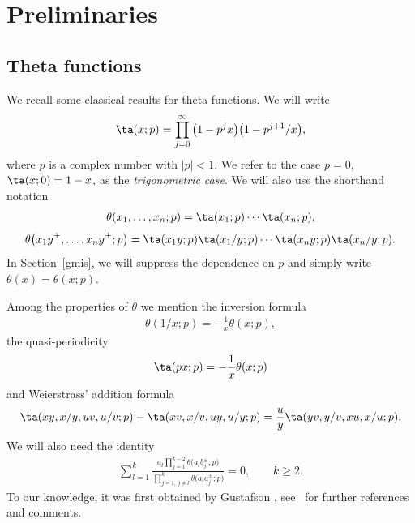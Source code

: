 \section{Preliminaries}

\subsection{Theta functions}

We recall some classical results for theta functions.
We will write
\begin{gather*}
\ta(x;p)=\prod\limits_{j=0}^\infty\big(1-p^jx\big)\big(1-p^{j+1}/x\big),
\end{gather*}
where $p$ is a complex number with $|p|<1$.
We refer to the case
 $p=0$, $\ta(x;0)=1-x$, as the \emph{trigonometric case}.
We will also use the shorthand notation
\begin{gather*}
\theta(x_1,\dots,x_n;p)=\ta(x_1;p)\dotsm\ta(x_n;p),
\end{gather*}
\begin{gather*}
\theta\big(x_1y^{\pm},\dots,x_ny^{\pm};p\big)=\ta(x_1y;p)\ta(x_1/y;p)\dotsm\ta(x_ny;p)
\ta(x_n/y;p).
\end{gather*}
In Section~\ref{gmis}, we will suppress the dependence on $p$ and simply write
$\theta(x)=\theta(x;p)$.


Among the properties of $\theta$ we mention the inversion formula
\begin{gather}
\label{ti}\theta(1/x;p)=-\frac1 x \theta(x;p),
\end{gather}
the quasi-periodicity
\begin{gather}
\label{qpt}\ta(px;p)=-\frac1 x \theta(x;p)
\end{gather}
and Weierstrass' addition formula
\begin{gather}\label{tadd}
\ta(xy,x/y,uv,u/v;p)-\ta(xv,x/v,uy,u/y;p)=\frac uy \ta(yv,y/v,xu,x/u;p).
\end{gather}
We will also need the identity
\begin{gather}\label{cpf}
\sum_{l=1}^k\frac{a_l\prod\limits_{j=1}^{k-2}\theta\big(a_lb_j^\pm;p\big)}
{\prod\limits_{j=1,\,j\neq l}^k\theta\big(a_la_j^\pm;p\big)}=0, \qquad
k\geq 2.
\end{gather}
To our knowledge, it was first obtained by Gustafson
\cite[Lemma~4.14]{gu}, see~\cite{r} for further references and comments.
